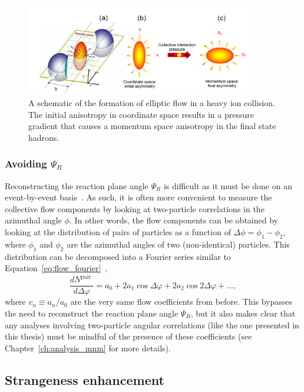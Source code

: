 \begin{figure}[ht]
    \centering
    \includegraphics[width=0.9\textwidth]{figures/introduction/elliptic_flow.png}
    \caption{A schematic of the formation of elliptic flow in a heavy ion collision. The initial anisotropy in coordinate space results in a pressure gradient that causes a momentum space anisotropy in the final state hadrons.}
    \label{fig:elliptic_flow}
\end{figure}


\subsubsection{Avoiding $\Psi_R$}
\label{sec:v2_twoparticle}
Reconstructing the reaction plane angle $\Psi_R$ is difficult as it must be done on an event-by-event basis~\cite{Flow24}. As such, it is often more convenient to measure the collective flow components by looking at two-particle correlations in the azimuthal angle $\phi$. In other words, the flow components can be obtained by looking at the distribution of pairs of particles as a function of $\Delta\phi = \phi_1 - \phi_2$, where $\phi_1$ and $\phi_2$ are the azimuthal angles of two (non-identical) particles. This distribution can be decomposed into a Fourier series similar to Equation~\ref{eq:flow_fourier}~\cite{FlowDphi}, 
%
\begin{equation}
    \label{eq:flow_dphi}
    \frac{d N^{\text {pair }}}{d \Delta \varphi}=a_0+2 a_1 \cos \Delta \varphi+2 a_2 \cos 2 \Delta \varphi+\ldots,
\end{equation}
where $v_n \equiv a_n/a_0$ are the very same flow coefficients from before. This bypasses the need to reconstruct the reaction plane angle $\Psi_R$, but it also makes clear that any analyses involving two-particle angular correlations (like the one presented in this thesis) must be mindful of the presence of these coefficients (see Chapter~\ref{ch:analysis_mnm} for more details).


\subsection{Strangeness enhancement}
\label{sec:strangeness_enhancement}

